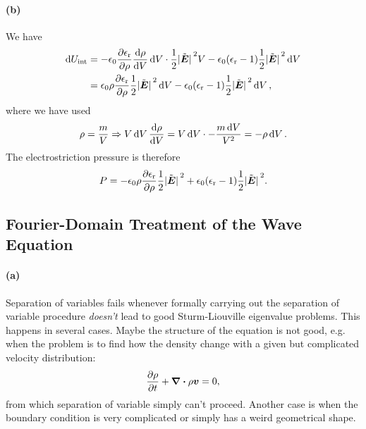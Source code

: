 \documentclass[hyperref, a4paper]{article}
\newcommand{\epsr}{\epsilon_{\text{r}}}
\begin{document}
\paragraph{(b)} We have 
\begin{equation}
    \begin{aligned}
        \dd{U_{\text{int}}} &= 
        - \epsilon_0 \pdv{\epsr}{\rho} \dv{\rho}{V} \dd{V} \cdot \frac{1}{2} \abs*{\tilde{\vb*{E}}}^2 V 
        - \epsilon_0 (\epsr - 1) \frac{1}{2} \abs*{\tilde{\vb*{E}}}^2 \dd{V} \\
        &= \epsilon_0 \rho \pdv{\epsr}{\rho} \frac{1}{2} \abs*{\tilde{\vb*{E}}}^2 \dd{V}
        - \epsilon_0 (\epsr - 1) \frac{1}{2} \abs*{\tilde{\vb*{E}}}^2 \dd{V} ,
    \end{aligned}
\end{equation}
where we have used 
\begin{equation}
    \rho = \frac{m}{V} \Rightarrow
    V \dd{V} \dv{\rho}{V} = V \dd{V} \cdot - \frac{m \dd{V}}{V^2}
    = - \rho \dd{V}.
\end{equation}
The electrostriction pressure is therefore 
\begin{equation}
    P = - \epsilon_0 \rho \pdv{\epsr}{\rho} \frac{1}{2} \abs*{\tilde{\vb*{E}}}^2 
    + \epsilon_0 (\epsr - 1) \frac{1}{2} \abs*{\tilde{\vb*{E}}}^2.
\end{equation}

\subsection{Fourier-Domain Treatment of the Wave Equation}

\paragraph{(a)} Separation of variables fails whenever 
formally carrying out the separation of variable procedure 
\emph{doesn't} lead to good Sturm-Liouville eigenvalue problems.
This happens in several cases.
Maybe the structure of the equation is not good, e.g. 
when the problem is to find how the density change 
with a given but complicated velocity distribution:
\begin{equation}
    \pdv{\rho}{t} + \div{\rho \vb*{v}} = 0,
\end{equation}
from which separation of variable simply can't proceed. 
Another case is when the boundary condition is very complicated 
or simply has a weird geometrical shape.
\end{document}
